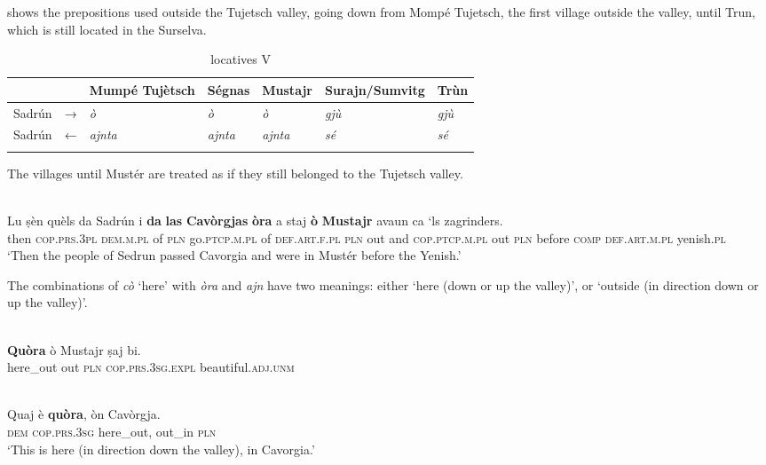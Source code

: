  shows the prepositions used outside the Tujetsch valley, going down from Mompé Tujetsch, the first village outside the valley, until Trun, which is still located in the Surselva.

\begin{table}
	\caption{locatives V}
	\label{loc5}
	\begin{tabular}{lllllll}
		\lsptoprule
		&       & Mumpé Tujètsch & Ségnas & Mustajr & Surajn/Sumvitg & Trùn\\ 
		\midrule
		Sadrún  & →  & \textit{ò} & \textit{ò}  &    \textit{ò} & \textit{gjù} & \textit{gjù}\\
		Sadrún & ← & \textit{ajnta} & \textit{ajnta} & \textit{ajnta} & \textit{sé}  & \textit{sé} \\
		\lspbottomrule
	\end{tabular}
\end{table}

The villages until Mustér  are treated as if they still belonged to the Tujetsch valley.

\ea
\label{}
\\
\gll Lu ṣèn quèls da Sadrún i \textbf{da} \textbf{las} \textbf{Cavòrgjas} \textbf{òra} a staj \textbf{ò} \textbf{Mustajr} avaun ca `ls zagrinders.\\
then \textsc{cop.prs.3pl} \textsc{dem.m.pl} of \textsc{pln} go.\textsc{ptcp.m.pl} of \textsc{def.art.f.pl} \textsc{pln} out and \textsc{cop.ptcp.m.pl} out \textsc{pln} before \textsc{comp} \textsc{def.art.m.pl} yenish.\textsc{pl}\\
\glt `Then the people of Sedrun passed  Cavorgia and were in Mustér before the Yenish.'
\z

The combinations of \textit{cò} `here' with \textit{òra} and \textit{ajn} have two meanings: either `here (down or up the valley)', or `outside (in direction down or up the valley)'.

\ea
\label{}
\\
\gll \textbf{Quòra} ò Mustajr ṣaj bi.\\
here\_out out \textsc{pln} \textsc{cop.prs.3sg.expl} beautiful.\textsc{adj.unm}\\
\z

\ea
\label{}
\\
\gll Quaj è \textbf{quòra}, òn Cavòrgja.\\
\textsc{dem} \textsc{cop.prs.3sg} here\_out, out\_in \textsc{pln}\\
\glt `This is here (in direction down the valley), in Cavorgia.'
\z

